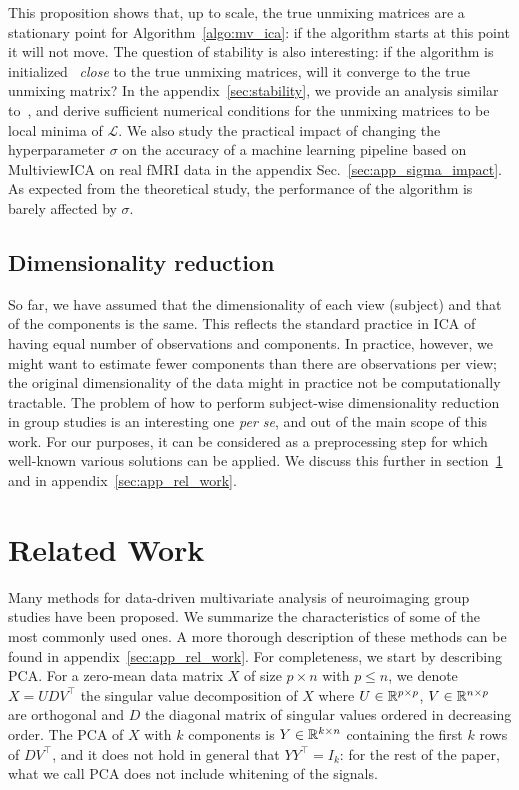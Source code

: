 \documentclass[12pt]{report}
\begin{document}
This proposition shows that, up to scale, the true unmixing matrices are a stationary point for Algorithm~\ref{algo:mv_ica}: if the algorithm starts at this point it will not move.
%
The question of stability is also interesting: if the algorithm is initialized ~\emph{close} to the true unmixing matrices, will it converge to the true unmixing matrix?
%
In the appendix~\ref{sec:stability}, we provide an analysis similar to~\cite{cardoso1998blind}, and derive sufficient numerical conditions for the unmixing matrices to be local minima of $\mathcal{L}$.
%
We also study the practical impact of changing the hyperparameter $\sigma$ on the accuracy of a machine learning pipeline based on MultiviewICA on real fMRI data in the appendix Sec.~\ref{sec:app_sigma_impact}.
%
As expected from the theoretical study, the performance of the algorithm is barely affected by $\sigma$.
\subsection{Dimensionality reduction}
%
So far, we have assumed that the dimensionality of each view (subject) and that of the components is the same. This reflects the standard practice in ICA of having equal number of observations and components. 
%
In practice, however, we might want to estimate fewer components than there are observations per view; the original dimensionality of the data %
might in practice not be computationally tractable.
%
The problem of how to perform subject-wise dimensionality reduction in group studies 
is an interesting one \emph{per se}, and out of the main scope of this work. For our purposes, it can be considered as a preprocessing step for which well-known various solutions can be applied. %
We discuss this further in section~\ref{sec:rel_work} and in appendix~\ref{sec:app_rel_work}.
%
%
%
\section{Related Work}
\label{sec:rel_work}
Many methods for data-driven multivariate analysis of neuroimaging group studies have been proposed. We summarize the characteristics of some of the most commonly used ones. A more thorough description of these methods can be found in appendix~\ref{sec:app_rel_work}.
%
For completeness, we start by describing PCA. For a zero-mean data matrix $X$ of size $p\times n$ with $p \leq n$, we denote $X= UD V^{\top}$ the singular value decomposition of $X$ where $U \in \mathbb{R}^{p\times p}$, $V \in \mathbb{R}^{n \times p}$ are orthogonal and $D$ the diagonal matrix of singular values ordered in decreasing order.
%
The PCA of $X$ with $k$ components is $Y\in\mathbb{R}^{k\times n}$ containing the first $k$ rows of $DV^{\top}$, and it does not hold in general that $YY^{\top}=I_k$: for the rest of the paper, what we call PCA does not include whitening of the signals.
\end{document}
